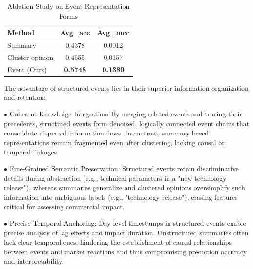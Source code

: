 \documentclass[sigconf, nonacm]{acmart} %
\begin{document}
\begin{table}[h]
\centering
\small
\caption{Ablation Study on Event Representation Forms}
\label{tab:ablation_events}
\begin{tabular}{lcc}
\toprule
Method & Avg\_acc & Avg\_mcc \\
\midrule
Summary & 0.4378 & 0.0012 \\
Cluster opinion & 0.4655 & 0.0157 \\
Event (Ours) & \textbf{0.5748} & \textbf{0.1380} \\
\bottomrule
\end{tabular}
\end{table}
The advantage of structured events lies in their superior information organization and retention:

$\bullet$ Coherent Knowledge Integration: By merging related events and tracing their precedents, structured events form denoised, logically connected event chains that consolidate dispersed information flows. In contrast, summary-based representations remain fragmented even after clustering, lacking causal or temporal linkages.

$\bullet$ Fine-Grained Semantic Preservation: Structured events retain discriminative details during abstraction (e.g., technical parameters in a "new technology release"), whereas summaries generalize and clustered opinions oversimplify such information into ambiguous labels (e.g., "technology release"), erasing features critical for assessing commercial impact.

$\bullet$ Precise Temporal Anchoring: Day-level timestamps in structured events enable precise analysis of lag effects and impact duration. Unstructured summaries often lack clear temporal cues, hindering the establishment of causal relationships between events and market reactions and thus compromising prediction accuracy and interpretability.
\end{document}
